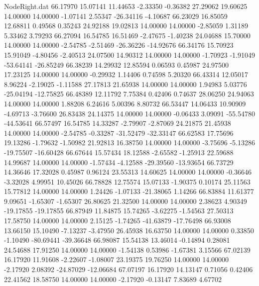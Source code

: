 \begin{filecontents}{NodeRight.dat}
  66.17970   15.07141   11.44653    -2.33350   -0.36382   27.29062   19.60625   14.00000   14.00000   -1.07141    2.55347  -26.34116   -4.10687
  66.23029   16.85059   12.68811     0.49568    0.35243   24.92188   19.02813   14.00000   14.00000   -2.85059    1.31189    5.33462    3.79293
  66.27094   16.54785   16.51469    -2.47675   -1.40238   24.04688   15.70000   14.00000   14.00000   -2.54785   -2.51469  -26.36226  -14.92676
  66.34176   15.70923   15.91049    -4.80456   -2.40513   24.07500   14.90312   14.00000   14.00000   -1.70923   -1.91049  -53.64141  -26.85249
  66.38239   14.29932   12.85594     0.06593    0.45987   24.97500   17.23125   14.00000   14.00000   -0.29932    1.14406    0.74598    5.20320
  66.43314   12.05017    8.96224    -2.19025   -1.11588   27.17813   21.65938   14.00000   14.00000    1.94983    5.03776  -25.04194  -12.75825
  66.48389   12.11792    7.75384     0.42406    0.74637   28.06250   24.94063   14.00000   14.00000    1.88208    6.24616    5.00396    8.80732
  66.53447   14.06433   10.90909    -4.69713   -3.76600   26.83438   24.14375   14.00000   14.00000   -0.06433    3.09091  -55.54780  -44.53641
  66.57497   16.54785   14.33287    -2.79907   -2.87069   24.21875   21.45938   14.00000   14.00000   -2.54785   -0.33287  -31.52479  -32.33147
  66.62583   17.75696   19.13286    -1.79632   -1.50982   21.92813   16.38750   14.00000   14.00000   -3.75696   -5.13286  -19.75507  -16.60428
  66.67644   15.57434   18.12588    -2.65582   -1.25913   22.59688   14.99687   14.00000   14.00000   -1.57434   -4.12588  -29.39560  -13.93654
  66.73729   14.36646   17.32028     0.45987    0.96124   23.55313   14.60625   14.00000   14.00000   -0.36646   -3.32028    4.99951   10.45026
  66.78828   12.75574   15.07133    -1.90375    0.10174   25.11563   15.77812   14.00000   14.00000    1.24426   -1.07133  -21.38065    1.14266
  66.83884   11.61377    9.09651    -1.65307   -1.65307   26.80625   21.32500   14.00000   14.00000    2.38623    4.90349  -19.17855  -19.17855
  66.87949   11.84875   15.74265    -3.62275   -1.54563   27.50313   17.58750   14.00000   14.00000    2.15125   -1.74265  -41.63879  -17.76498
  66.93008   13.66150   15.10490    -7.13237   -3.47950   26.45938   16.63750   14.00000   14.00000    0.33850   -1.10490  -80.69441  -39.36648
  66.98087   15.54138   13.46014    -0.14894    0.28081   24.54688   17.91250   14.00000   14.00000   -1.54138    0.53986   -1.67381    3.15566
  67.02139   16.17920   11.91608    -2.22607   -1.08007   23.19375   19.76250   14.00000   14.00000   -2.17920    2.08392  -24.87029  -12.06684
  67.07197   16.17920   14.13147     0.71056    0.42406   22.41562   18.58750   14.00000   14.00000   -2.17920   -0.13147    7.83689    4.67702

\end{filecontents}
